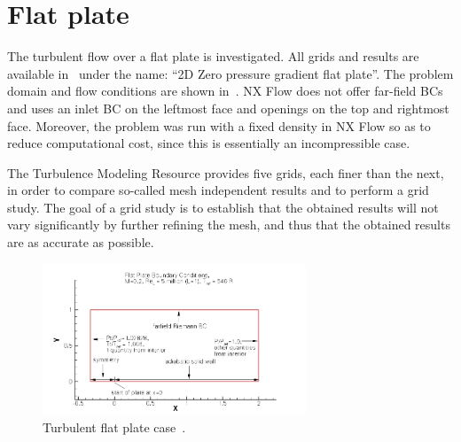 \section{Flat plate}
The turbulent flow over a flat plate is investigated. All grids and results are available in~\cite{tmr} under the name: ``2D Zero pressure gradient flat plate''. The problem domain and flow conditions are shown in~. NX Flow does not offer far-field BCs and uses an inlet BC on the leftmost face and openings on the top and rightmost face. Moreover, the problem was run with a fixed density in NX Flow so as to reduce computational cost, since this is essentially an incompressible case. 

The Turbulence Modeling Resource provides five grids, each finer than the next, in order to compare so-called mesh independent results and to perform a grid study. The goal of a grid study is to establish that the obtained results will not vary significantly by further refining the mesh, and thus that the obtained results are as accurate as possible.
\begin{figure}
    \centering
    \includegraphics[width=0.7\textwidth]{figs/flat/flatplate.png}
    \caption{Turbulent flat plate case~\cite{tmr}.}
    \label{fig:flat}
\end{figure}

